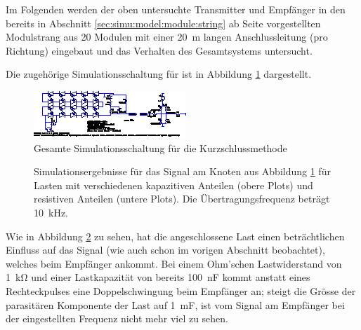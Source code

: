 Im  Folgenden   werden  der  oben  untersuchte   Transmitter  und  Empf\"anger
in  den  bereits  in  Abschnitt  \ref{sec:simu:model:module:string}  ab  Seite
\pageref{sec:simu:model:module:string}   vorgestellten   Modulstrang  aus   20
Modulen  mit  einer  \SI{20}{\meter} langen  Anschlussleitung  (pro  Richtung)
eingebaut und das Verhalten des Gesamtsystems untersucht.

Die zugeh\"orige  Simulationsschaltung f\"ur   ist  in Abbildung
\ref{fig:ltspice:shortcircuit:complete} dargestellt.

\begin{figure}[h!tb]
    \includegraphics[width=\textwidth]{images/ltspice/jac/shortcircuit.eps}
    \caption[-Schaltung f\"ur Kurzschlussmethode, Modulstrang]
    {Gesamte Simulationsschaltung f\"ur die Kurzschlussmethode}
    \label{fig:ltspice:shortcircuit:complete}
\end{figure}

\begin{figure}[h!tb]
    \centering
    
    \caption[Simulationsergebnisse Kurzschlussmethode]{%
        Simulationsergebnisse  f\"ur  das  Signal  am  Knoten  
        aus  Abbildung  \ref{fig:ltspice:shortcircuit:complete}  f\"ur  Lasten
        mit   verschiedenen    kapazitiven   Anteilen       (obere
        Plots)  und  resistiven   Anteilen    (untere  Plots). Die
        \"Ubertragungsfrequenz betr\"agt \SI{10}{\kilo\hertz}.%
    }
    \label{fig:simu:short:complete}
\end{figure}

Wie   in   Abbildung   \ref{fig:simu:short:complete}   zu   sehen,   hat   die
angeschlossene Last einen  betr\"achtlichen Einfluss auf das  Signal (wie auch
schon im vorigen Abschnitt  beobachtet), welches beim Empf\"anger ankommt. Bei
einem Ohm'schen Lastwiderstand von \SI{1}{\kilo\ohm} und einer Lastkapazit\"at
von  bereits \SI{100}{\nano\farad}  kommt  anstatt  eines Rechteckpulses  eine
Doppelschwingung beim  Empf\"anger an;  steigt die Gr\"osse  der parasit\"aren
Komponente der  Last auf \SI{1}{\milli\farad},  ist vom Signal  am Empf\"anger
bei der eingestellten Frequenz nicht mehr viel zu sehen.

